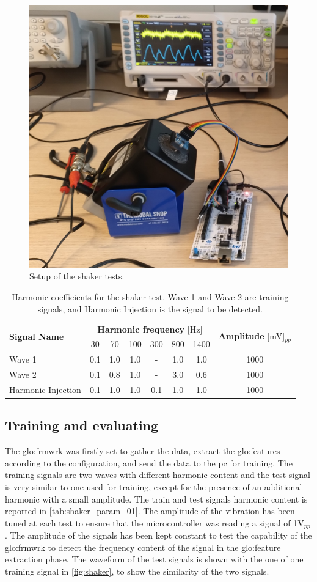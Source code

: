 \begin{figure}
    \centering
    \includegraphics[width=.4\textwidth]{Images/shaker/IMG_20231207_103126143.jpg}
    \caption{Setup of the shaker tests.}
    \label{fig:shaker_setup}
\end{figure}
\begin{table}
    \centering
    \caption{Harmonic coefficients for the shaker test. Wave 1 and Wave 2 are training signals, and Harmonic Injection is the signal to be detected.}
    \label{tab:shaker_param_01}
    \begin{tabular}{lccccccc} 
    \toprule
    \multirow{2}{*}{\textbf{Signal Name }} & \multicolumn{6}{c}{\textbf{Harmonic frequency} [Hz]} & \multirow{2}{*}{\textbf{Amplitude} [mV]$_{pp}$} \\
     & 30 & 70 & 100 & 300 & 800 & 1400 &  \\ 
    \hline
    Wave 1 & 0.1 & 1.0 & 1.0 & \multicolumn{1}{c}{-} & 1.0 & 1.0 & 1000 \\
    Wave 2 & 0.1 & 0.8 & 1.0 & \multicolumn{1}{c}{-} & 3.0 & 0.6 & 1000 \\
    Harmonic Injection & 0.1 & 1.0 & 1.0 & 0.1 & 1.0 & 1.0 & 1000 \\
    \bottomrule
    \end{tabular}
    \end{table}

\subsection{Training and evaluating}
The \gls{glo:frmwrk} was firstly set to gather the data, extract the \gls{glo:feature}s according to the configuration, and send the data to the \gls{pc} for training. The training signals are two waves with different harmonic content and the test signal is very similar to one used for training, except for the presence of an additional harmonic with a small amplitude. The train and test signals harmonic content is reported in \autoref{tab:shaker_param_01}. The amplitude of the vibration has been tuned at each test to ensure that the microcontroller was reading a signal of 1V$_{pp}$. The amplitude of the signals has been kept constant to test the capability of the \gls{glo:frmwrk} to detect the frequency content of the signal in the \gls{glo:feature} extraction phase. The waveform of the test signals is shown with the one of one training signal in \autoref{fig:shaker}, to show the similarity of the two signals. 

